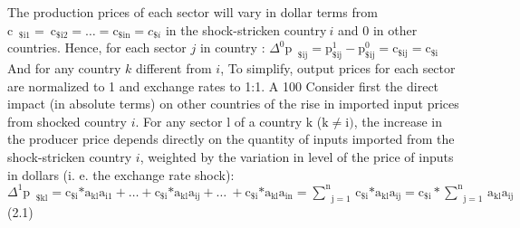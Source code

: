 \documentclass[11pt,a4paper]{article}
\begin{document}
The production prices of each sector will vary in dollar terms from ${{\text{c}}_{\text{ }\!\!\$\!\!\text{i}1}}=\text{}\!\!~\!\!\text{}{{\text{c}}_{\text{}\!\!\$\!\!\text{i}2}}=\ldots={{\text{c}}_{\text{}\!\!\$\!\!\text{in}}}={{c}_{\$i}}$ in the shock-stricken country$~i$ and 0 in other countries. 
Hence, for each sector $j$ in country  : ${{\Delta }^{0}}{{\text{p}}_{\text{ }\!\!\$\!\!\text{ij}}}=\text{p}_{\text{}\!\!\$\!\!\text{ij}}^{1}-\text{p}_{\text{}\!\!\$\!\!\text{ij}}^{0}={{\text{c}}_{\text{}\!\!\$\!\!\text{ij}}}={{\text{c}}_{\text{}\!\!\$\!\!\text{i}}}$
And for any country $k$ different from $i$,  	
To simplify, output prices for each sector are normalized to 1 and exchange rates to 1:1. A 100%
Consider first the direct impact (in absolute terms) on other countries of the rise in imported input prices from shocked country $i$. For any sector l of a country $\text{k}$ ($\text{k}\ne \text{i})$, the increase in the producer price depends directly on the quantity of inputs imported from the shock-stricken country $i$, weighted by the variation in level of the price of inputs in dollars (i. e. the exchange rate shock):
${{\Delta }^{1}}{{\text{p}}_{\text{ }\!\!\$\!\!\text{kl}}}={{\text{c}}_{\text{}\!\!\$\!\!\text{i}}}\text{*}{{\text{a}}_{\text{kl}}}{{\text{a}}_{\text{i}1}}+\ldots+{{\text{c}}_{\text{}\!\!\$\!\!\text{i}}}\text{*}{{\text{a}}_{\text{kl}}}{{\text{a}}_{\text{ij}}}+\ldots\text{}\!\!~\!\!\text{}+{{\text{c}}_{\text{}\!\!\$\!\!\text{i}}}\text{*}{{\text{a}}_{\text{kl}}}{{\text{a}}_{\text{in}}}=\underset{\text{j}=1}{\overset{\text{n}}{\mathop\sum}}\,{{\text{c}}_{\text{}\!\!\$\!\!\text{i}}}\text{*}{{\text{a}}_{\text{kl}}}{{\text{a}}_{\text{ij}}}={{\text{c}}_{\text{}\!\!\$\!\!\text{i}}}*\underset{\text{j}=1}{\overset{\text{n}}{\mathop\sum}}\,{{\text{a}}_{\text{kl}}}{{\text{a}}_{\text{ij}}}$  
(2.1)
\end{document}
